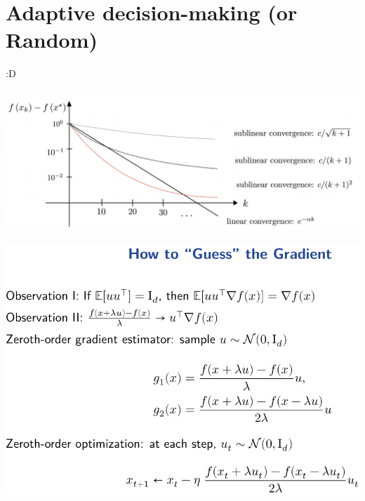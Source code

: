 \section{Adaptive decision-making (or Random)}

:D

\includegraphics[width=.95\columnwidth]{images/sublinear.png}


\includegraphics[width=.95\columnwidth]{images/guess_gradient.png}
